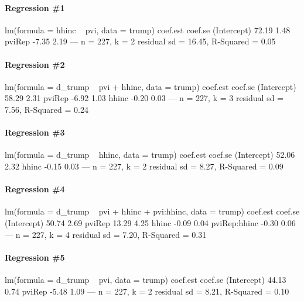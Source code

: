 \documentclass[addpoints,12pt]{exam}
\begin{document}
\begin{questions}
\newpage
\footnotesize
\paragraph{\footnotesize Regression \#1}
\begin{boxedverbatim}
lm(formula = hhinc ~ pvi, data = trump)
            coef.est coef.se
(Intercept) 72.19     1.48  
pviRep      -7.35     2.19  
---
n = 227, k = 2
residual sd = 16.45, R-Squared = 0.05
\end{boxedverbatim}
\vspace{-1em}

\paragraph{\footnotesize Regression \#2}
\begin{boxedverbatim}
lm(formula = d_trump ~ pvi + hhinc, data = trump)
            coef.est coef.se
(Intercept) 58.29     2.31  
pviRep      -6.92     1.03  
hhinc       -0.20     0.03  
---
n = 227, k = 3
residual sd = 7.56, R-Squared = 0.24
\end{boxedverbatim}
\vspace{-1em}

\paragraph{\footnotesize Regression \#3}
\begin{boxedverbatim}
lm(formula = d_trump ~ hhinc, data = trump)
            coef.est coef.se
(Intercept) 52.06     2.32  
hhinc       -0.15     0.03  
---
n = 227, k = 2
residual sd = 8.27, R-Squared = 0.09
\end{boxedverbatim}
\vspace{-1em}

\paragraph{\footnotesize Regression \#4}
\begin{boxedverbatim}
lm(formula = d_trump ~ pvi + hhinc + pvi:hhinc, data = trump)
             coef.est coef.se
(Intercept)  50.74     2.69  
pviRep       13.29     4.25  
hhinc        -0.09     0.04  
pviRep:hhinc -0.30     0.06  
---
n = 227, k = 4
residual sd = 7.20, R-Squared = 0.31
\end{boxedverbatim}
\vspace{-1em}

\paragraph{\footnotesize Regression \#5}
\begin{boxedverbatim}
lm(formula = d_trump ~ pvi, data = trump)
            coef.est coef.se
(Intercept) 44.13     0.74  
pviRep      -5.48     1.09  
---
n = 227, k = 2
residual sd = 8.21, R-Squared = 0.10
\end{boxedverbatim}


\end{questions}
\end{document}
